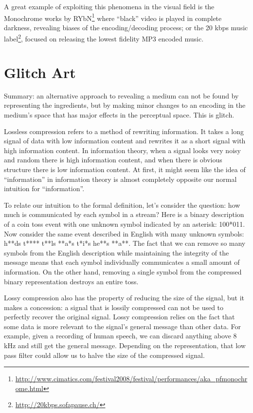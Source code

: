 \documentclass{thesis}
\begin{document}
	A great example of exploiting this phenomena in the visual field is the Monochrome works by RYbN\footnote{\url{http://www.cimatics.com/festival2008/festival/performances/aka_pfmonochrome.html}} where ``black'' video is played in complete darkness, revealing biases of the encoding/decoding process; or the 20 kbps music label\footnote{\url{http://20kbps.sofapause.ch/}}, focused on releasing the lowest fidelity MP3 encoded music.
	
\section{Glitch Art}
	Summary: an alternative approach to revealing a medium can not be found by representing the ingredients, but by making minor changes to an encoding in the medium's space that has major effects in the perceptual space. This is glitch.
	
	Lossless compression refers to a method of rewriting information. It takes a long signal of data with low information content and rewrites it as a short signal with high information content. In information theory, when a signal looks very noisy and random there is high information content, and when there is obvious structure there is low information content. At first, it might seem like the idea of ``information'' in information theory is almost completely opposite our normal intuition for ``information''.
	
	To relate our intuition to the formal definition, let's consider the question: how much is communicated by each symbol in a stream? Here is a binary description of a coin toss event with one unknown symbol indicated by an asterisk: 100*011. Now consider the same event described in English with many unknown symbols: h**ds t**** t**ls **a*s t*i*s he**s **a**. The fact that we can remove so many symbols from the English description while maintaining the integrity of the message means that each symbol individually communicates a small amount of information. On the other hand, removing a single symbol from the compressed binary representation destroys an entire toss.
	
	Lossy compression also has the property of reducing the size of the signal, but it makes a concession: a signal that is lossily compressed can not be used to perfectly recover the original signal. Lossy compression relies on the fact that some data is more relevant to the signal's general message than other data. For example, given a recording of human speech, we can discard anything above 8 kHz and still get the general message. Depending on the representation, that low pass filter could allow us to halve the size of the compressed signal.
	
\end{document}
